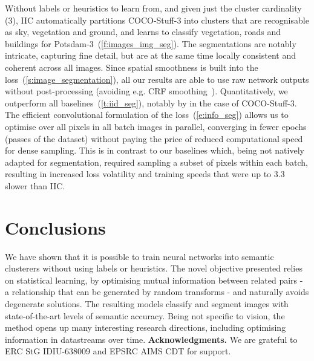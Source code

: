 \documentclass[10pt,twocolumn,letterpaper]{article}
\makeatletter
\newcommand{\methodnameshort}{IIC\xspace}
\renewcommand{\paragraph}{\@startsection{paragraph}{4}{\z@}{0.5em}{-1em}{\normalfont\normalsize\bfseries}}
\makeatother
\begin{document}
\paragraph{Analysis.}
 Without labels or heuristics to learn from, and given just the cluster cardinality (3), \methodnameshort automatically partitions COCO-Stuff-3 into clusters that are recognisable as sky, vegetation and ground, and learns to classify vegetation, roads and buildings for Potsdam-3~(\cref{f:images_img_seg}). The segmentations are notably intricate, capturing fine detail, but are at the same time locally consistent and coherent across all images. Since spatial smoothness is built into the loss~(\cref{s:image_segmentation}), all our results are able to use raw network outputs without post-processing (avoiding e.g. CRF smoothing~\cite{chen2018deeplab}). Quantitatively, we outperform all baselines~(\cref{t:iid_seg}), notably by  in the case of COCO-Stuff-3. The efficient convolutional formulation of the loss~(\cref{e:info_seg}) allows us to optimise over all pixels in all batch images in parallel, converging in fewer epochs (passes of the dataset) without paying the price of reduced computational speed for dense sampling. This is in contrast to our baselines which, being not natively adapted for segmentation, required sampling a subset of pixels within each batch, resulting in increased loss volatility and training speeds that were up to 3.3 slower than \methodnameshort.

\begin{comment}
Note the disparity between \methodnameshort and semi-supervised overclustering for COCO-Stuff due to the lack of visual cohesion in its 15 classes, which for example puts plants and vegetables into disparate classes.
Thus IID+, which learns a more fine-grained separation of images ( clusters in this case) is unsurprisingly more suitable and sees a performance increase of 18\%.
In contrast, COCO-Stuff-3 and Potsdam-3 contain classes with much higher visual consistency, allowing for easier separation.
This can be seen in the low IID vs.\ IID+ disparity~(\cref{t:iid_seg}) as well as in the comparable quality of their rendered predictions~(\cref{f:images_img_seg}).
\end{comment}


 \section{Conclusions}\label{s:conc}
We have shown that it is possible to train neural networks into semantic clusterers without using labels or heuristics. The novel objective presented relies on statistical learning, by optimising mutual information between related pairs - a relationship that can be generated by random transforms - and naturally avoids degenerate solutions. The resulting models classify and segment images with state-of-the-art levels of semantic accuracy. Being not specific to vision, the method opens up many interesting research directions, including optimising information in datastreams over time.  
{\noindent\textbf{Acknowledgments.} We are grateful to ERC StG IDIU-638009 and EPSRC AIMS CDT for support.}
{\small}
\end{document}
